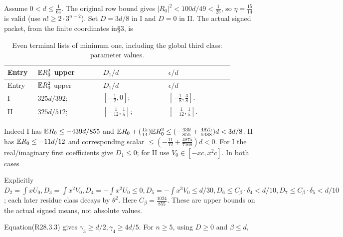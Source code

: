 Assume \(0<d\le \frac{1}{64}\). The original row bound gives \(\lvert R_0\rvert ^2<100d/49<\frac{1}{25}\), so \(\eta=\frac{15}{14}\) is valid (use \(n!\ge 2\cdot 3^{n-2}\)). Set \(D=3d/8\) in I and \(D=0\) in II. The actual signed packet, from the finite coordinates in§3, is


\begingroup\small
\setlength{\tabcolsep}{3pt}
\setlength{\LTleft}{0pt}\setlength{\LTright}{\fill}
\begin{longtable}{@{}p{0.1200\linewidth}p{0.2667\linewidth}p{0.2667\linewidth}p{0.2667\linewidth}@{}}
\caption{Even terminal lists of minimum one, including the global third class: parameter values.}\label{tab:parameters:r2-c028:5}\\
\toprule
Entry & \(\mathbb E R_0^2\) upper & \(D_1/d\) & \(\epsilon/d\) \\
\midrule\endfirsthead
\toprule
Entry & \(\mathbb E R_0^2\) upper & \(D_1/d\) & \(\epsilon/d\) \\
\midrule\endhead
\bottomrule\endfoot
I & \(325d/392\); & \([-\frac{1}{2},\allowbreak \allowbreak 0]\); & \([-\frac{1}{8},\allowbreak \allowbreak \frac{3}{8}]\). \\
\addlinespace[2pt]
II & \(325d/512\); & \([-\frac{1}{12},\allowbreak \allowbreak \frac{1}{5}]\); & \([-\frac{1}{12},\allowbreak \allowbreak \frac{1}{5}]\). \\
\end{longtable}
\endgroup


Indeed I has \(\mathbb E R_0\le -439d/855\) and \(\mathbb E R_0+(\frac{15}{14})\mathbb E R_0^2\le (-\frac{439}{855}+\frac{4875}{5488})d<3d/8\). II has \(\mathbb E R_0\le -11d/12\) and corresponding scalar \(\le (-\frac{11}{12}+\frac{4875}{7168})d<0\). For I the real/imaginary first coefficients give \(D_1\le 0\); for II use \(V_0\in  [-xc,\allowbreak \allowbreak x^2c]\). In both cases


Explicitly \(D_2=\int  xU_{0},\allowbreak \allowbreak D_3=\int  x^2V_0,\allowbreak \allowbreak D_4=-\int  x^2U_0\le 0,\allowbreak \allowbreak  D_5=-\int  x^3V_0\le d/30,\allowbreak \allowbreak D_6\le C_\beta\cdot \delta_4<d/10,\allowbreak \allowbreak D_7\le C_\beta\cdot \delta_5<d/10\); each later residue class decays by \(\theta^2\). Here \(C_\beta=\frac{1024}{855}\). These are upper bounds on the actual signed means, not absolute values.

Equation(R28.3.3) gives \(\gamma_{3}\ge d/2,\allowbreak \allowbreak \gamma_{4}\ge 4d/5\). For \(n\ge 5\), using \(D\ge 0\) and \(\beta\le d\),

